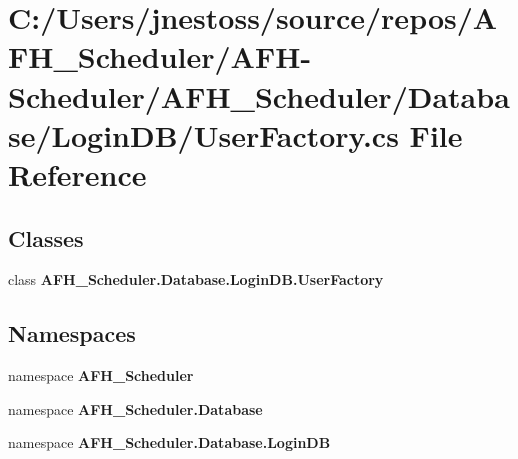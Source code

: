 \section{C\+:/\+Users/jnestoss/source/repos/\+A\+F\+H\+\_\+\+Scheduler/\+A\+F\+H-\/\+Scheduler/\+A\+F\+H\+\_\+\+Scheduler/\+Database/\+Login\+D\+B/\+User\+Factory.cs File Reference}
\label{_user_factory_8cs}
\subsection*{Classes}
\begin{DoxyCompactItemize}
\item 
class {\bfseries A\+F\+H\+\_\+\+Scheduler.\+Database.\+Login\+D\+B.\+User\+Factory}
\end{DoxyCompactItemize}
\subsection*{Namespaces}
\begin{DoxyCompactItemize}
\item 
namespace \textbf{ A\+F\+H\+\_\+\+Scheduler}
\item 
namespace \textbf{ A\+F\+H\+\_\+\+Scheduler.\+Database}
\item 
namespace \textbf{ A\+F\+H\+\_\+\+Scheduler.\+Database.\+Login\+DB}
\end{DoxyCompactItemize}

